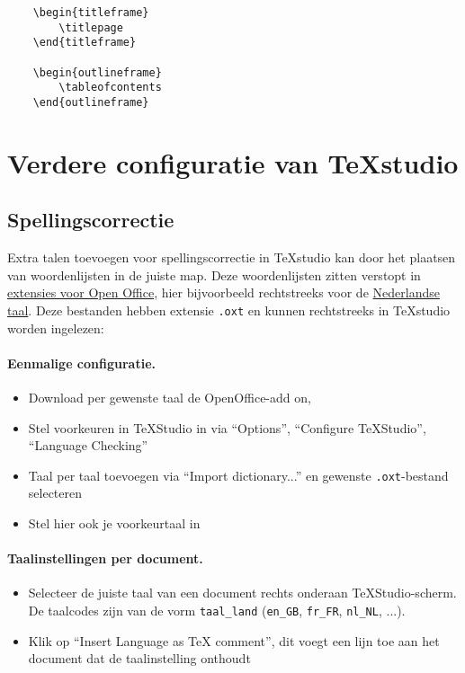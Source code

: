 \documentclass[kulak]{kulakarticle} %
\begin{document}
\begin{verbatim}
	\begin{titleframe}
		\titlepage
	\end{titleframe}
	
	\begin{outlineframe}
		\tableofcontents
	\end{outlineframe}
\end{verbatim}
							
\section{Verdere configuratie van TeXstudio}
\label{sec:texstudio}
\subsection{Spellingscorrectie}
Extra talen toevoegen voor spellingscorrectie in TeXstudio kan door het plaatsen van woordenlijsten in de juiste map. Deze woordenlijsten zitten verstopt in \href{http://extensions.openoffice.org/dictionaries}{extensies voor Open Office}, hier bijvoorbeeld rechtstreeks voor de \href{http://extensions.openoffice.org/en/project/dutch-spelling-and-hyphenation-dictionary}{Nederlandse taal}. Deze bestanden hebben extensie \texttt{.oxt} en kunnen rechtstreeks in TeXstudio worden ingelezen:

\paragraph{Eenmalige configuratie.}
\begin{itemize}
\item Download per gewenste taal de OpenOffice-add on,
\item Stel voorkeuren in TeXStudio in via ``Options'', ``Configure TeXStudio'', ``Language Checking''
\item Taal per taal toevoegen via ``Import dictionary...'' en gewenste \texttt{.oxt}-bestand selecteren
\item Stel hier ook je voorkeurtaal in
\end{itemize}

\paragraph{Taalinstellingen per document.}
\begin{itemize}
\item Selecteer de juiste taal van een document rechts onderaan TeXStudio-scherm. De taalcodes zijn van de vorm \texttt{taal\_land} (\texttt{en\_GB}, \texttt{fr\_FR}, \texttt{nl\_NL}, ...).
\item Klik op ``Insert Language as TeX comment'', dit voegt een lijn toe aan het document dat de taalinstelling onthoudt
\end{itemize}
\end{document}

